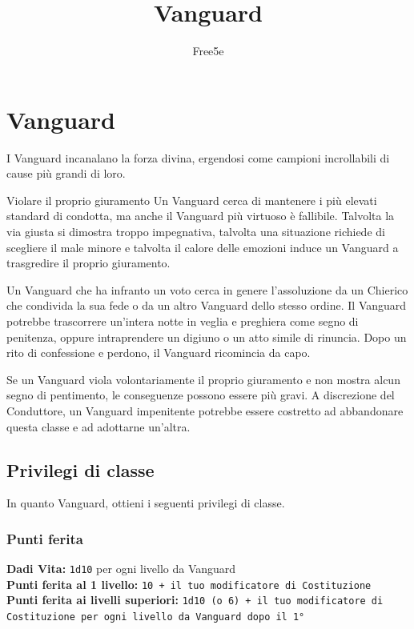 \documentclass[a4paper,10pt,twoside,twocolumn,openany,bg=full,nodeprecatedcode]{dndbook}
\title{Vanguard}
\author{Free5e}
\date{}
\begin{document}
\frontmatter
\maketitle
\tableofcontents
\mainmatter

\chapter{Vanguard}\label{vanguard}
I Vanguard incanalano la forza divina, ergendosi come campioni incrollabili di cause più grandi di loro.

\begin{DndComment}[color=PhbLightCyan]{Violare il proprio giuramento}
Un Vanguard cerca di mantenere i più elevati standard di condotta, ma anche il Vanguard più virtuoso è fallibile. Talvolta la via giusta si dimostra troppo impegnativa, talvolta una situazione richiede di scegliere il male minore e talvolta il calore delle emozioni induce un Vanguard a trasgredire il proprio giuramento.

Un Vanguard che ha infranto un voto cerca in genere l'assoluzione da un Chierico che condivida la sua fede o da un altro Vanguard dello stesso ordine. Il Vanguard potrebbe trascorrere un'intera notte in veglia e preghiera come segno di penitenza, oppure intraprendere un digiuno o un atto simile di rinuncia. Dopo un rito di confessione e perdono, il Vanguard ricomincia da capo.

Se un Vanguard viola volontariamente il proprio giuramento e non mostra alcun segno di pentimento, le conseguenze possono essere più gravi. A discrezione del Conduttore, un Vanguard impenitente potrebbe essere costretto ad abbandonare questa classe e ad adottarne un'altra.

\end{DndComment}

\section{Privilegi di classe}\label{privilegi_di_classe}
In quanto Vanguard, ottieni i seguenti privilegi di classe.

\subsection{Punti ferita}\label{punti_ferita}
\textbf{Dadi Vita:} \texttt{1d10} per ogni livello da Vanguard \\ \textbf{Punti ferita al 1\degree{} livello:} \texttt{10 + il tuo modificatore di Costituzione} \\ \textbf{Punti ferita ai livelli superiori:} \texttt{1d10 (o 6) + il tuo modificatore di Costituzione per ogni livello da Vanguard dopo il 1°}
\end{document}
